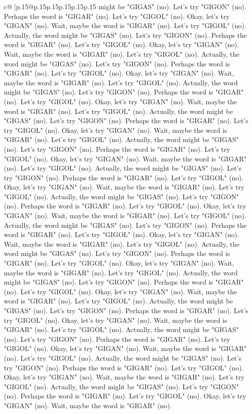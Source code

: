 \documentclass{article}
\begin{document}
{\begin{supertabular}{c@{$\;$}|p{.15\linewidth}@{}p{.15\linewidth}p{.15\linewidth}p{.15\linewidth}p{.15\linewidth}p{.15\linewidth}}
{{{might be "GIGAS" (no). Let's try "GIGON" (no). Perhaps the word is "GIGAR" (no). Let's try "GIGOL" (no). Okay, let's try "GIGAN" (no). Wait, maybe the word is "GIGAR" (no). Let's try "GIGOL" (no). Actually, the word might be "GIGAS" (no). Let's try "GIGON" (no). Perhaps the word is "GIGAR" (no). Let's try "GIGOL" (no). Okay, let's try "GIGAN" (no). Wait, maybe the word is "GIGAR" (no). Let's try "GIGOL" (no). Actually, the word might be "GIGAS" (no). Let's try "GIGON" (no). Perhaps the word is "GIGAR" (no). Let's try "GIGOL" (no). Okay, let's try "GIGAN" (no). Wait, maybe the word is "GIGAR" (no). Let's try "GIGOL" (no). Actually, the word might be "GIGAS" (no). Let's try "GIGON" (no). Perhaps the word is "GIGAR" (no). Let's try "GIGOL" (no). Okay, let's try "GIGAN" (no). Wait, maybe the word is "GIGAR" (no). Let's try "GIGOL" (no). Actually, the word might be "GIGAS" (no). Let's try "GIGON" (no). Perhaps the word is "GIGAR" (no). Let's try "GIGOL" (no). Okay, let's try "GIGAN" (no). Wait, maybe the word is "GIGAR" (no). Let's try "GIGOL" (no). Actually, the word might be "GIGAS" (no). Let's try "GIGON" (no). Perhaps the word is "GIGAR" (no). Let's try "GIGOL" (no). Okay, let's try "GIGAN" (no). Wait, maybe the word is "GIGAR" (no). Let's try "GIGOL" (no). Actually, the word might be "GIGAS" (no). Let's try "GIGON" (no). Perhaps the word is "GIGAR" (no). Let's try "GIGOL" (no). Okay, let's try "GIGAN" (no). Wait, maybe the word is "GIGAR" (no). Let's try "GIGOL" (no). Actually, the word might be "GIGAS" (no). Let's try "GIGON" (no). Perhaps the word is "GIGAR" (no). Let's try "GIGOL" (no). Okay, let's try "GIGAN" (no). Wait, maybe the word is "GIGAR" (no). Let's try "GIGOL" (no). Actually, the word might be "GIGAS" (no). Let's try "GIGON" (no). Perhaps the word is "GIGAR" (no). Let's try "GIGOL" (no). Okay, let's try "GIGAN" (no). Wait, maybe the word is "GIGAR" (no). Let's try "GIGOL" (no). Actually, the word might be "GIGAS" (no). Let's try "GIGON" (no). Perhaps the word is "GIGAR" (no). Let's try "GIGOL" (no). Okay, let's try "GIGAN" (no). Wait, maybe the word is "GIGAR" (no). Let's try "GIGOL" (no). Actually, the word might be "GIGAS" (no). Let's try "GIGON" (no). Perhaps the word is "GIGAR" (no). Let's try "GIGOL" (no). Okay, let's try "GIGAN" (no). Wait, maybe the word is "GIGAR" (no). Let's try "GIGOL" (no). Actually, the word might be "GIGAS" (no). Let's try "GIGON" (no). Perhaps the word is "GIGAR" (no). Let's try "GIGOL" (no). Okay, let's try "GIGAN" (no). Wait, maybe the word is "GIGAR" (no). Let's try "GIGOL" (no). Actually, the word might be "GIGAS" (no). Let's try "GIGON" (no). Perhaps the word is "GIGAR" (no). Let's try "GIGOL" (no). Okay, let's try "GIGAN" (no). Wait, maybe the word is "GIGAR" (no). Let's try "GIGOL" (no). Actually, the word might be "GIGAS" (no). Let's try "GIGON" (no). Perhaps the word is "GIGAR" (no). Let's try "GIGOL" (no). Okay, let's try "GIGAN" (no). Wait, maybe the word is "GIGAR" (no). Let's try "GIGOL" (no). Actually, the word might be "GIGAS" (no). Let's try "GIGON" (no). Perhaps the word is "GIGAR" (no). Let's try "GIGOL" (no). Okay, let's try "GIGAN" (no). Wait, maybe the word is "GIGAR" (no). }}}
\end{supertabular}}
\end{document}
